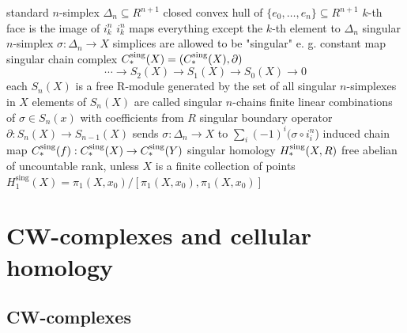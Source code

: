 \begin{outline}
    \1 standard $n$-simplex $\Delta_n\subseteq R^{n+1}$
        \2 closed convex hull of $\{e_0,\ldots,e_{n}\}\subseteq R^{n+1}$
    \1 $k$-th face is the image of $i^n_k$  
        \2 $i^n_k$ maps everything except the $k$-th element to $\Delta_n$
    \1 singular $n$-simplex $\sigma:\Delta_n\rightarrow X$
        \2 simplices are allowed to be "singular" e. g. constant map
    \1 singular chain complex $C^{\operatorname{sing}}_*(X)= (C^{\operatorname{sing}}_*(X), \partial)$
        $$\cdots \longrightarrow S_2(X)\longrightarrow S_1(X)\longrightarrow S_0(X) \longrightarrow 0$$
        \2 each $S_n(X)$ is a free R-module generated by the set of all singular $n$-simplexes in $X$
            \3 elements of $S_n(X)$ are called singular $n$-chains
            \3 finite linear combinations of $\sigma \in S_n(x)$ with coefficients from $R$
        \2 singular boundary operator $\partial: S_n(X)\rightarrow S_{n-1}(X)$
            \3 sends $\sigma:\Delta_n \rightarrow X$ to $\sum_{i} (-1)^{i} (\sigma \circ i^n_i$)
    \1 induced chain map $C^{\operatorname{sing}}_*(f):C^{\operatorname{sing}}_*(X)\rightarrow C^{\operatorname{sing}}_*(Y)$
    \1 singular homology $H^{\operatorname{sing}}_*(X,R)$
        \2 free abelian of uncountable rank, unless $X$ is a finite collection of points
    \1 $H^{\text{sing}}_1(X)=\pi_1(X,x_0)/[\pi_1(X,x_0),\pi_1(X,x_0)]$
\end{outline}

\section{CW-complexes and cellular homology}


\subsection{CW-complexes}

